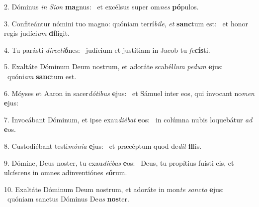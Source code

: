 2. Dóminus \textit{in} \textit{Si}\textit{on} \textbf{ma}gnus: \ast\  et excélsus super om\textit{nes} \textbf{pó}pulos.\

3. Confiteántur nómini tuo magno: quóniam terrí\textit{bi}\textit{le}, \textit{et} \textbf{sanc}tum est: \ast\  et honor regis judíci\textit{um} \textbf{dí}ligit.\

4. Tu parásti \textit{di}\textit{rec}\textit{ti}\textbf{ó}nes: \ast\  judícium et justítiam in Jacob tu \textit{fe}\textbf{cís}ti.\

5. Exaltáte Dóminum Deum nostrum, et adoráte scabél\textit{lum} \textit{pe}\textit{dum} \textbf{e}jus: \ast\  quóni\textit{am} \textbf{sanc}tum est.\

6. Móyses et Aaron in sacer\textit{dó}\textit{ti}\textit{bus} \textbf{e}jus: \ast\  et Sámuel inter eos, qui ínvocant no\textit{men} \textbf{e}jus:\

7. Invocábant Dóminum, et ipse exau\textit{di}\textit{é}\textit{bat} \textbf{e}os: \ast\  in colúmna nubis loquebátur \textit{ad} \textbf{e}os.\

8. Custodiébant testi\textit{mó}\textit{ni}\textit{a} \textbf{e}jus: \ast\  et præcéptum quod de\textit{dit} \textbf{il}lis.\

9. Dómine, Deus noster, tu exau\textit{di}\textit{é}\textit{bas} \textbf{e}os: \ast\  Deus, tu propítius fuísti eis, et ulcíscens in omnes adinventiónes \textit{e}\textbf{ó}rum.\

10. Exaltáte Dóminum Deum nostrum, et adoráte in mon\textit{te} \textit{sanc}\textit{to} \textbf{e}jus: \ast\  quóniam sanctus Dóminus De\textit{us} \textbf{nos}ter.\

